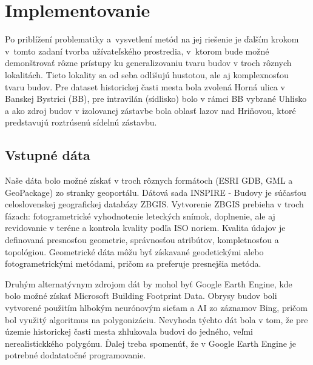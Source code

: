 \documentclass[12pt]{article}
\begin{document}
\section*{Implementovanie}
Po priblížení problematiky a vysvetlení metód na jej riešenie je ďalším krokom v tomto zadaní tvorba užívateľského prostredia, v ktorom bude možné demonštrovať  rôzne prístupy ku generalizovaniu tvaru budov v troch rôznych lokalitách. Tieto lokality sa od seba odlišujú hustotou, ale aj komplexnosťou tvaru budov. Pre dataset historickej časti mesta bola zvolená Horná ulica v Banskej Bystrici (BB), pre intravilán (sídlisko) bolo v rámci BB vybrané Uhlisko a ako zdroj budov v izolovanej zástavbe bola oblasť lazov nad Hriňovou, ktoré predstavujú roztrúsenú sídelnú zástavbu.
\subsection*{Vstupné dáta}
Naše dáta bolo možné získať v troch rôznych formátoch (ESRI GDB, GML a GeoPackage) zo stranky geoportálu. Dátová sada INSPIRE - Budovy je súčasťou celoslovenskej geografickej databázy ZBGIS. Vytvorenie ZBGIS prebieha v troch fázach: fotogrametrické vyhodnotenie leteckých snímok, doplnenie, ale aj revidovanie v teréne a kontrola kvality podľa ISO noriem. Kvalita údajov je definovaná presnosťou geometrie, správnosťou atribútov, kompletnosťou a topológiou. Geometrické dáta môžu byť získavané geodetickými alebo fotogrametrickými metódami, pričom sa preferuje presnejšia metóda.
\par Druhým alternatývnym zdrojom dát by mohol byť Google Earth Engine, kde bolo možné získať Microsoft Building Footprint Data. Obrysy budov boli vytvorené použitím hlbokým neurónovým sieťam a AI zo záznamov Bing, pričom bol využitý algoritmus na polygonizáciu. Nevyhoda týchto dát bola v tom, že pre územie historickej časti mesta zhlukovala budovi do jedného, veľmi nerealistickkého polygónu. Ďalej treba spomenúť, že v Google Earth Engine je potrebné dodatatočné programovanie. 
\end{document}
